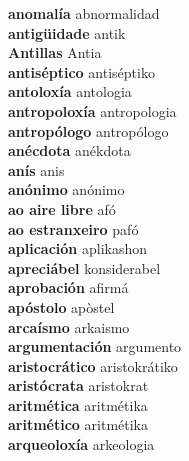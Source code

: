 \textbf{ anomalía  } abnormalidad \\
\textbf{ antigüidade  } antik \\
\textbf{ Antillas  } Antia \\
\textbf{ antiséptico  } antiséptiko \\
\textbf{ antoloxía  } antologia \\
\textbf{ antropoloxía  } antropologia \\
\textbf{ antropólogo  } antropólogo \\
\textbf{ anécdota  } anékdota \\
\textbf{ anís  } anis \\
\textbf{ anónimo  } anónimo \\
\textbf{ ao aire libre  } afó \\
\textbf{ ao estranxeiro  } pafó \\
\textbf{ aplicación  } aplikashon \\
\textbf{ apreciábel  } konsiderabel \\
\textbf{ aprobación  } afirmá \\
\textbf{ apóstolo  } apòstel \\
\textbf{ arcaísmo  } arkaismo \\
\textbf{ argumentación  } argumento \\
\textbf{ aristocrático  } aristokrátiko \\
\textbf{ aristócrata  } aristokrat \\
\textbf{ aritmética  } aritmétika \\
\textbf{ aritmético  } aritmétika \\
\textbf{ arqueoloxía  } arkeologia \\
